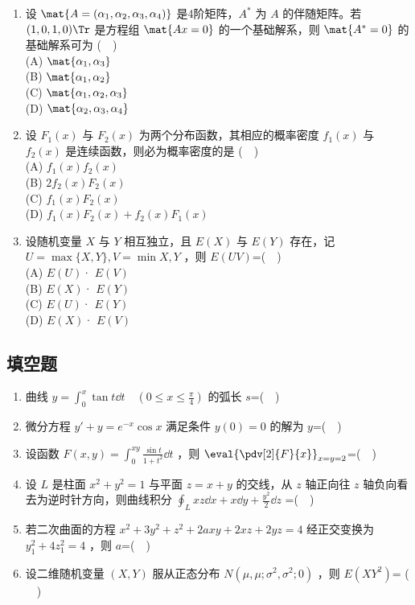 \begin{enumerate}
(D) $\mat {P_2,P_1^{-1}}$
\item  设 $\mat{A=(\alpha_1,\alpha_2,\alpha_3,\alpha_4)}$ 是4阶矩阵，$A^*$  为 $A$ 的伴随矩阵。若 $(1,0,1,0) \Tr$ 是方程组 $\mat {Ax=0}$ 的一个基础解系，则 $\mat {A^*=0}$ 的基础解系可为 ($\quad$)\\
(A) $\mat {\alpha_1,\alpha_3}$\\
(B) $\mat {\alpha_1,\alpha_2}$\\
(C) $\mat {\alpha_1,\alpha_2,\alpha_3}$\\
(D) $\mat {\alpha_2,\alpha_3,\alpha_4}$
\item  设 $F_1(x)$ 与 $F_2(x)$ 为两个分布函数，其相应的概率密度 $f_1(x)$ 与 $f_2(x)$ 是连续函数，则必为概率密度的是 ($\quad$)\\
(A) $f_1(x)f_2(x)$\\
(B)  $2f_2(x)F_2(x)$\\
(C) $f_1(x)F_2(x)$\\
(D) $f_1(x)F_2(x)+f_2(x)F_1(x)$
\item 设随机变量 $X$ 与 $Y$ 相互独立，且 $E(X)$ 与 $E(Y)$ 存在，记 $U=\max \{X,Y\},V=\min {X,Y}$ ，则 $E(UV)$=($\quad$)\\
(A) $E(U)$· $E(V)$\\
(B)  $E(X)$· $E(Y)$\\
(C) $E(U)$· $E(Y)$\\
(D) $E(X)$· $E(V)$\\
\end{enumerate}
\subsection{填空题}
\begin{enumerate}
\item 曲线 $y=\int_{0}^{x} \tan t\dd{t} \quad (0 \le x \le \frac{\pi}{4})$  的弧长 $s$=($\quad$) 
\item 微分方程 $y'+y=e^{-x}\cos x$ 满足条件 $y(0)=0$  的解为 $y$=($\quad$) 
\item  设函数 $\displaystyle F(x,y)=\int_0^{xy} \frac{\sin t}{1+t^2}\dd{t}$ ，则 $\displaystyle {\eval{ \pdv[2]{F}{x}}_{x=y=2}}$=($\quad$)
\item  设 $L$ 是柱面 $x^2+y^2=1$ 与平面 $z=x+y$ 的交线，从 $z$ 轴正向往 $z$ 轴负向看去为逆时针方向，则曲线积分 $\displaystyle \oint_L xz\dd{x}+x\dd{y}+\frac{y^2}{2}\dd{z}$ =($\quad$)
\item  若二次曲面的方程  $x^2+3y^2+z^2+2axy+2xz+2yz=4$ 经正交变换为 $y_1^2+4z_1^2=4$ ，则 $a$=($\quad$)
\item  设二维随机变量 $(X,Y)$ 服从正态分布 $N(\mu,\mu;\sigma^2,\sigma^2;0)$ ，则 $E(XY^2)$= ($\quad$)
\end{enumerate}
